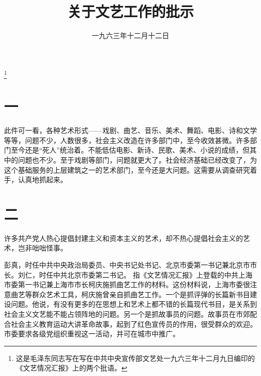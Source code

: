 
\title{关于文艺工作的批示}
\date{一九六三年十二月十二日}
\thanks{这是毛泽东同志写在写在中共中央宣传部文艺处一九六三年十二月九日编印的《文艺情况汇报》上的两个批语。}
\maketitle


\section*{一}


此件可一看，各种艺术形式——戏剧、曲艺、音乐、美术、舞蹈、电影、诗和文学等等，问题不少，人数很多，社会主义改造在许多部门中，至今收效甚微。许多部门至今还是“死人”统治着。不能低估电影、新诗、民歌、美术、小说的成绩，但其中的问题也不少。至于戏剧等部门，问题就更大了。社会经济基础已经改变了，为这个基础服务的上层建筑之一的艺术部门，至今还是大问题。这需要从调查研究着手，认真地抓起来。

\section*{二}

许多共产党人热心提倡封建主义和资本主义的艺术，却不热心提倡社会主义的艺术，岂非咄咄怪事。

\begin{maonote}
彭真，时任中共中央政治局委员、中央书记处书记、北京市委第一书记兼北京市市长。刘仁，时任中共北京市委第二书记。
指《文艺情况汇报》上登载的中共上海市委第一书记兼上海市市长柯庆施抓曲艺工作的材料。这份材料说，上海市委很注意曲艺等群众艺术工具，柯庆施曾亲自抓曲艺工作。一个是抓评弹的长篇新书目建设问题。他说，有没有更多的在思想上和艺术上都不错的长篇现代书目，是关系到社会主义文艺能不能占领阵地的问题。另一个是抓故事员的问题。故事员在市郊配合社会主义教育运动大讲革命故事，起到了红色宣传员的作用，很受群众的欢迎。市委要求各级党组织重视这一活动，并可在城市中推广。
\end{maonote}
